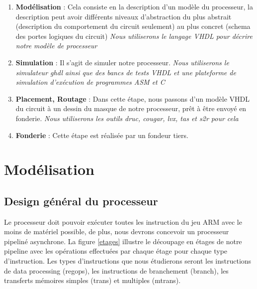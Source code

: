\documentclass{report}
\begin{document}
\begin{enumerate}
\item \textbf{Modélisation}  : Cela consiste en la description d'un modèle du processeur,
                      la description peut avoir différents niveaux d'abstraction
                      du plus abstrait (description du comportement du circuit seulement)
                      au plus concret (schema des portes logiques du circuit)
                      \textit{Nous utiliserons le langage VHDL pour décrire notre modèle de processeur}
\item \textbf{Simulation}    : Il s'agit de simuler notre processeur.
                      \textit{Nous utiliserons le simulateur ghdl ainsi que des bancs de tests VHDL
                      et une plateforme de simulation d'exécution de programmes ASM et C}
\item \textbf{Placement, Routage} : Dans cette étape, nous passons d'un modèle VHDL du circuit à un
                          dessin du masque de notre processeur, prêt à être envoyé en fonderie.
                          \textit{Nous utiliserons les outils druc, cougar, lvx, tas et s2r pour cela}
\item \textbf{Fonderie} :          Cette étape est réalisée par un fondeur tiers.
\end{enumerate}

\section{Modélisation}

\subsection{Design général du processeur}

Le processeur doit pouvoir exécuter toutes les instruction du jeu ARM avec le moins
de matériel possible, de plus, nous devrons concevoir un processeur pipeliné asynchrone.
La figure \ref{etages} illustre le découpage en étages de notre pipeline avec les opérations effectuées
par chaque étage pour chaque type d'instruction.
Les types d'instructions que nous étudierons seront les instructions de data processing (regops),
les instructions de branchement (branch), les transferts mémoires simples (trans) et multiples (mtrans).
\end{document}
